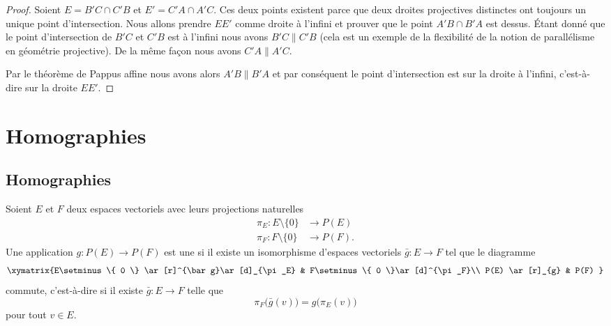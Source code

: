 \begin{proof}
	Soient \( E=B'C\cap C'B\) et \( E'=C'A\cap A'C\). Ces deux points existent parce que deux droites projectives distinctes ont toujours un unique point d'intersection. Nous allons prendre \( EE'\) comme droite à l'infini et prouver que le point \( A'B\cap B'A\) est dessus. Étant donné que le point d'intersection de \( B'C\) et \( C'B\) est à l'infini nous avons \( B'C\parallel C'B\) (cela est un exemple de la flexibilité de la notion de parallélisme en géométrie projective). De la même façon nous avons \( C'A\parallel A'C\).

	Par le théorème de Pappus affine nous avons alors \( A'B\parallel B'A\) et par conséquent le point d'intersection est sur la droite à l'infini, c'est-à-dire sur la droite \( EE'\).
\end{proof}

\section{Homographies}

\subsection{Homographies}

\begin{definition}      \label{DEFooKWSMooXvOeEP}
	Soient \( E\) et \( F\) deux espaces vectoriels avec leurs projections naturelles
	\begin{subequations}
		\begin{align}
			\pi_E\colon E\setminus\{ 0 \} & \to P(E)  \\
			\pi_F\colon F\setminus\{ 0 \} & \to P(F).
		\end{align}
	\end{subequations}
	Une application \( g\colon P(E)\to P(F)\) est une  si il existe un isomorphisme d'espaces vectoriels \( \bar g\colon E\to F\) tel que le diagramme
	\begin{equation}
		\xymatrix{%
			E\setminus\{ 0 \} \ar[r]^{\bar g}\ar[d]_{\pi_E}        &   F\setminus\{ 0 \}\ar[d]^{\pi_F}\\
			P(E) \ar[r]_{g}   &   P(F)
		}
	\end{equation}
	commute, c'est-à-dire si il existe \( \bar g\colon E\to F\) telle que
	\begin{equation}        \label{EQooSEFWooRpjLxt}
		\pi_F\big( \bar g(v) \big)=g\big( \pi_E(v) \big)
	\end{equation}
	pour tout \( v\in E\).
\end{definition}

